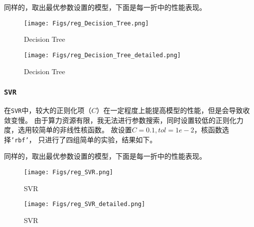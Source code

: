 \documentclass[12pt, a4paper, oneside]{ctexart}
\begin{document}
同样的，取出最优参数设置的模型，下面是每一折中的性能表现。

\begin{figure}[H]
    \centering
    \texttt{[image: Figs/reg\_Decision\_Tree.png]}
    \caption{Decision Tree}
\end{figure}

\begin{figure}[H]
    \centering
    \texttt{[image: Figs/reg\_Decision\_Tree\_detailed.png]}
    \caption{Decision Tree}
\end{figure}

\subsubsection{\texttt{SVR}}
在\texttt{SVR}中，较大的正则化项（$C$）在一定程度上能提高模型的性能，但是会导致收敛变慢。
由于算力资源有限，我无法进行参数搜索，同时设置较低的正则化力度，选用较简单的非线性核函数。
故设置$C=0.1, tol=1e-2$，核函数选择\texttt{'rbf'}，
只进行了四组简单的实验，结果如下。
\begin{table}[H]
    \centering
    \small %
    \setlength{\tabcolsep}{3.5pt} %
    \caption{Regression Metrics for SVR}
\end{table}

同样的，取出最优参数设置的模型，下面是每一折中的性能表现。

\begin{figure}[H]
    \centering
    \texttt{[image: Figs/reg\_SVR.png]}
    \caption{SVR}
\end{figure}

\begin{figure}[H]
    \centering
    \texttt{[image: Figs/reg\_SVR\_detailed.png]}
    \caption{SVR}
\end{figure}
\end{document}
